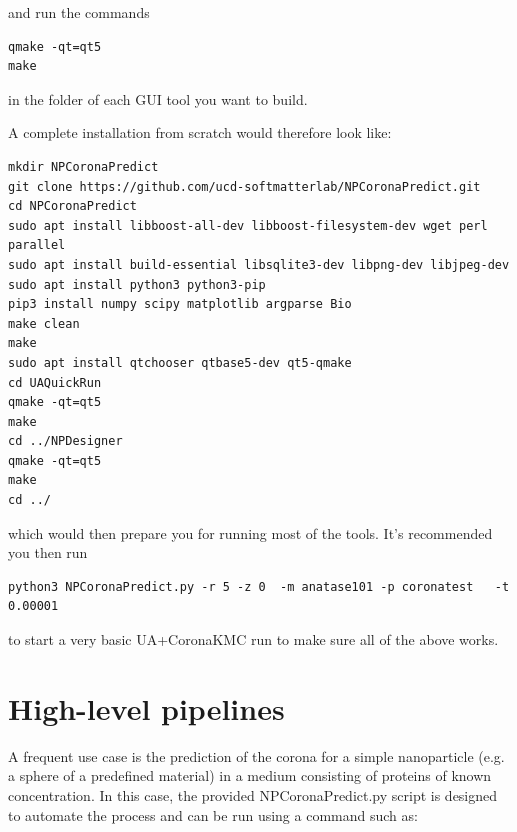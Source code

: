 \documentclass[10pt,a4paper,onecolumn]{report}
\begin{document}
and run the commands

\begin{lstlisting}
qmake -qt=qt5
make
\end{lstlisting} 
in the folder of each GUI tool you want to build. 

A complete installation from scratch would therefore look like:

\begin{lstlisting}
mkdir NPCoronaPredict
git clone https://github.com/ucd-softmatterlab/NPCoronaPredict.git
cd NPCoronaPredict
sudo apt install libboost-all-dev libboost-filesystem-dev wget perl parallel  
sudo apt install build-essential libsqlite3-dev libpng-dev libjpeg-dev
sudo apt install python3 python3-pip
pip3 install numpy scipy matplotlib argparse Bio
make clean
make
sudo apt install qtchooser qtbase5-dev qt5-qmake 
cd UAQuickRun
qmake -qt=qt5
make
cd ../NPDesigner
qmake -qt=qt5
make
cd ../
\end{lstlisting}

 which would then prepare you for running most of the tools. It's recommended you then run
 \begin{lstlisting}
python3 NPCoronaPredict.py -r 5 -z 0  -m anatase101 -p coronatest   -t 0.00001
\end{lstlisting}
to start a very basic UA+CoronaKMC run to make sure all of the above works.
 
\section{High-level pipelines}
A frequent use case is the prediction of the corona for a simple nanoparticle (e.g. a sphere of a predefined material) in a medium consisting of proteins of known concentration. In this case, the provided NPCoronaPredict.py script is designed to automate the process and can be run using a command such as:
\end{document}
